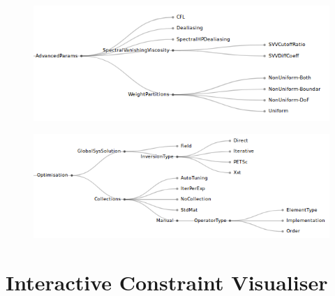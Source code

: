 \documentclass[11pt, a4paper]{report}
\begin{document}
\begin{figure}[tb!]
 \centering
 \includegraphics[width=1\linewidth,  clip=true, trim = .1cm 0cm 0cm 0cm]{AdvancedParameters}
 \label{fig:problemSpecification}
\end{figure}

\begin{figure}[tb!]
 \centering
 \includegraphics[width=1\linewidth,  clip=true, trim = .2cm 0cm 0cm 0cm]{optimisationb}
 \label{fig:problemSpecification}
\end{figure}

\chapter{Interactive Constraint Visualiser}
\label{app:constraints}
\end{document}
